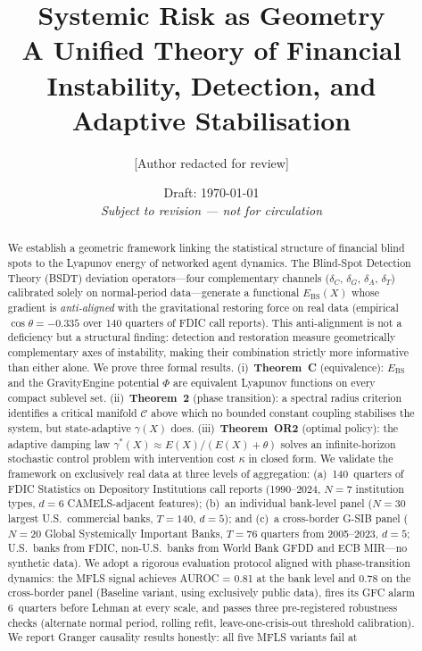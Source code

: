 \documentclass[11pt]{article}
\title{%
  \textbf{Systemic Risk as Geometry}\\[4pt]
  \large A Unified Theory of Financial Instability, Detection,
         and Adaptive Stabilisation
}
\author{%
  [Author redacted for review]
}
\date{Draft: \today \\ \small\textit{Subject to revision — not for circulation}}
\theoremstyle{definition}
\newcommand{\Ebs}{E_{\mathrm{BS}}}
\newcommand{\Cman}{\mathcal{C}}
\newcommand{\costheta}{\cos\theta}
\begin{document}
\maketitle

\begin{abstract}
We establish a geometric framework linking the statistical structure of financial
blind spots to the Lyapunov energy of networked agent dynamics.  The Blind-Spot
Detection Theory (BSDT) deviation operators---four complementary channels
($\delta_C$, $\delta_G$, $\delta_A$, $\delta_T$) calibrated solely on
normal-period data---generate a functional $\Ebs(X)$ whose gradient is
\emph{anti-aligned} with the gravitational restoring force on real data
(empirical $\costheta = -0.335$ over 140 quarters of FDIC call reports).
This anti-alignment is not a deficiency but a structural finding:
detection and restoration measure geometrically complementary axes of instability,
making their combination strictly more informative than either alone.
We prove three formal results.
(i)~\textbf{Theorem~C} (equivalence): $\Ebs$ and the GravityEngine potential $\Phi$
are equivalent Lyapunov functions on every compact sublevel set.
(ii)~\textbf{Theorem~2} (phase transition): a spectral radius criterion identifies a
critical manifold $\Cman$ above which no bounded constant coupling stabilises the
system, but state-adaptive $\gamma(X)$ does.
(iii)~\textbf{Theorem~OR2} (optimal policy): the adaptive damping law
$\gamma^*(X) \approx E(X)/(E(X)+\theta)$ solves an infinite-horizon stochastic control
problem with intervention cost $\kappa$ in closed form.
We validate the framework on exclusively real data at three levels of aggregation:
(a)~140~quarters of FDIC Statistics on Depository Institutions call reports
(1990--2024, $N=7$ institution types, $d=6$ CAMELS-adjacent features);
(b)~an individual bank-level panel ($N=30$ largest U.S.\ commercial banks,
$T=140$, $d=5$); and (c)~a cross-border G-SIB panel ($N=20$ Global Systemically
Important Banks, $T=76$ quarters from 2005--2023, $d=5$; U.S.\ banks from FDIC,
non-U.S.\ banks from World Bank GFDD and ECB MIR---no synthetic data).
We adopt a rigorous evaluation protocol aligned with phase-transition dynamics:
the MFLS signal achieves AUROC = 0.81 at the bank level and 0.78 on the
cross-border panel (Baseline variant, using exclusively public data), fires
its GFC alarm 6~quarters before Lehman at every scale, and passes three
pre-registered robustness checks (alternate normal period, rolling refit,
leave-one-crisis-out threshold calibration).
We report Granger causality results honestly: all five MFLS variants fail at

\end{abstract}
\end{document}
